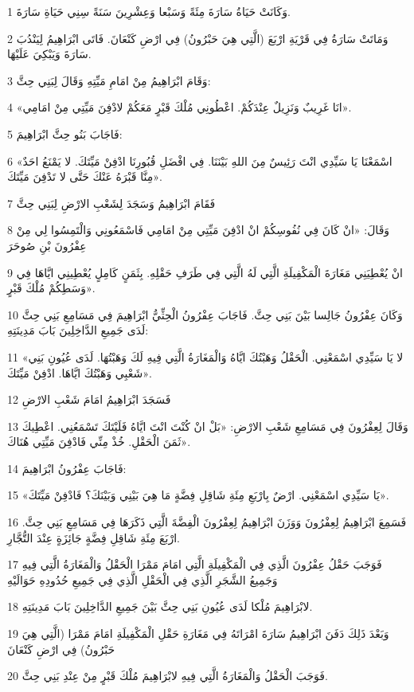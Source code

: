 \par 1 وَكَانَتْ حَيَاةُ سَارَةَ مِئَةً وَسَبْعا وَعِشْرِينَ سَنَةً سِنِي حَيَاةِ سَارَةَ.
\par 2 وَمَاتَتْ سَارَةُ فِي قَرْيَةِ ارْبَعَ (الَّتِي هِيَ حَبْرُونُ) فِي ارْضِ كَنْعَانَ. فَاتَى ابْرَاهِيمُ لِيَنْدُبَ سَارَةَ وَيَبْكِيَ عَلَيْهَا.
\par 3 وَقَامَ ابْرَاهِيمُ مِنْ امَامِ مَيِّتِهِ وَقَالَ لِبَنِي حِثَّ:
\par 4 «انَا غَرِيبٌ وَنَزِيلٌ عِنْدَكُمْ. اعْطُونِي مُلْكَ قَبْرٍ مَعَكُمْ لادْفِنَ مَيِّتِي مِنْ امَامِي».
\par 5 فَاجَابَ بَنُو حِثَّ ابْرَاهِيمَ:
\par 6 «اسْمَعْنَا يَا سَيِّدِي انْتَ رَئِيسٌ مِنَ اللهِ بَيْنَنَا. فِي افْضَلِ قُبُورِنَا ادْفِنْ مَيِّتَكَ. لا يَمْنَعُ احَدٌ مِنَّا قَبْرَهُ عَنْكَ حَتَّى لا تَدْفِنَ مَيِّتَكَ».
\par 7 فَقَامَ ابْرَاهِيمُ وَسَجَدَ لِشَعْبِ الارْضِ لِبَنِي حِثَّ
\par 8 وَقَالَ: «انْ كَانَ فِي نُفُوسِكُمْ انْ ادْفِنَ مَيِّتِي مِنْ امَامِي فَاسْمَعُونِي وَالْتَمِسُوا لِي مِنْ عِفْرُونَ بْنِ صُوحَرَ
\par 9 انْ يُعْطِيَنِي مَغَارَةَ الْمَكْفِيلَةِ الَّتِي لَهُ الَّتِي فِي طَرَفِ حَقْلِهِ. بِثَمَنٍ كَامِلٍ يُعْطِينِي ايَّاهَا فِي وَسَطِكُمْ مُلْكَ قَبْرٍ».
\par 10 وَكَانَ عِفْرُونُ جَالِسا بَيْنَ بَنِي حِثَّ. فَاجَابَ عِفْرُونُ الْحِثِّيُّ ابْرَاهِيمَ فِي مَسَامِعِ بَنِي حِثَّ لَدَى جَمِيعِ الدَّاخِلِينَ بَابَ مَدِينَتِهِ:
\par 11 «لا يَا سَيِّدِي اسْمَعْنِي. الْحَقْلُ وَهَبْتُكَ ايَّاهُ وَالْمَغَارَةُ الَّتِي فِيهِ لَكَ وَهَبْتُهَا. لَدَى عُيُونِ بَنِي شَعْبِي وَهَبْتُكَ ايَّاهَا. ادْفِنْ مَيِّتَكَ».
\par 12 فَسَجَدَ ابْرَاهِيمُ امَامَ شَعْبِ الارْضِ
\par 13 وَقَالَ لِعِفْرُونَ فِي مَسَامِعِ شَعْبِ الارْضِ: «بَلْ انْ كُنْتَ انْتَ ايَّاهُ فَلَيْتَكَ تَسْمَعُنِي. اعْطِيكَ ثَمَنَ الْحَقْلِ. خُذْ مِنِّي فَادْفِنَ مَيِّتِي هُنَاكَ».
\par 14 فَاجَابَ عِفْرُونُ ابْرَاهِيمَ:
\par 15 «يَا سَيِّدِي اسْمَعْنِي. ارْضٌ بِارْبَعِ مِئَةِ شَاقِلِ فِضَّةٍ مَا هِيَ بَيْنِي وَبَيْنَكَ؟ فَادْفِنْ مَيِّتَكَ».
\par 16 فَسَمِعَ ابْرَاهِيمُ لِعِفْرُونَ وَوَزَنَ ابْرَاهِيمُ لِعِفْرُونَ الْفِضَّةَ الَّتِي ذَكَرَهَا فِي مَسَامِعِ بَنِي حِثَّ. ارْبَعَ مِئَةِ شَاقِلِ فِضَّةٍ جَائِزَةٍ عِنْدَ التُّجَّارِ.
\par 17 فَوَجَبَ حَقْلُ عِفْرُونَ الَّذِي فِي الْمَكْفِيلَةِ الَّتِي امَامَ مَمْرَا الْحَقْلُ وَالْمَغَارَةُ الَّتِي فِيهِ وَجَمِيعُ الشَّجَرِ الَّذِي فِي الْحَقْلِ الَّذِي فِي جَمِيعِ حُدُودِهِ حَوَالَيْهِ
\par 18 لابْرَاهِيمَ مُلْكا لَدَى عُيُونِ بَنِي حِثَّ بَيْنَ جَمِيعِ الدَّاخِلِينَ بَابَ مَدِينَتِهِ.
\par 19 وَبَعْدَ ذَلِكَ دَفَنَ ابْرَاهِيمُ سَارَةَ امْرَاتَهُ فِي مَغَارَةِ حَقْلِ الْمَكْفِيلَةِ امَامَ مَمْرَا (الَّتِي هِيَ حَبْرُونُ) فِي ارْضِ كَنْعَانَ
\par 20 فَوَجَبَ الْحَقْلُ وَالْمَغَارَةُ الَّتِي فِيهِ لابْرَاهِيمَ مُلْكَ قَبْرٍ مِنْ عِنْدِ بَنِي حِثَّ.

